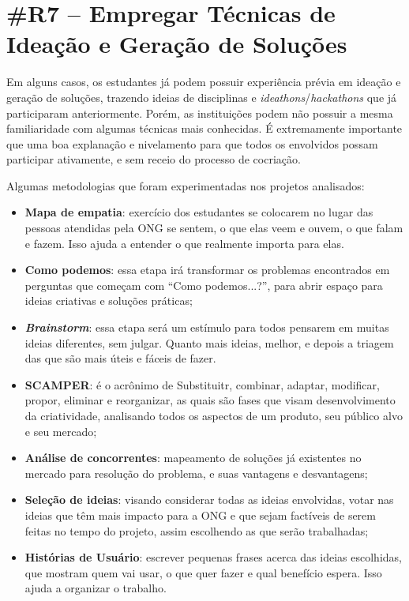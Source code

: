 \section*{\#R7 – Empregar Técnicas de Ideação e Geração de Soluções}

Em alguns casos, os estudantes já podem possuir experiência prévia em ideação e geração de soluções, trazendo ideias de disciplinas e \textit{ideathons}/\textit{hackathons} que já participaram anteriormente. Porém, as instituições podem não possuir a mesma familiaridade com algumas técnicas mais conhecidas. É extremamente importante que uma boa explanação e nivelamento para que todos os envolvidos possam participar ativamente, e sem receio do processo de cocriação.

Algumas metodologias que foram experimentadas nos projetos analisados:
\begin{itemize}
    \item \textbf{Mapa de empatia}: exercício dos estudantes se colocarem no lugar das pessoas atendidas pela ONG se sentem, o que elas veem e ouvem, o que falam e fazem. Isso ajuda a entender o que realmente importa para elas.
    \item \textbf{Como podemos}: essa etapa irá transformar os problemas encontrados em perguntas que começam com “Como podemos...?”, para abrir espaço para ideias criativas e soluções práticas;
    \item \textbf{\textit{Brainstorm}}: essa etapa será um estímulo para todos pensarem em muitas ideias diferentes, sem julgar. Quanto mais ideias, melhor, e depois a triagem das que são mais úteis e fáceis de fazer.
    \item \textbf{SCAMPER}: é o acrônimo de Substituitr, combinar, adaptar, modificar, propor, eliminar e reorganizar, as quais são fases que visam desenvolvimento da criatividade, analisando todos os aspectos de um produto, seu público alvo e seu mercado;
    \item \textbf{Análise de concorrentes}: mapeamento de soluções já existentes no mercado para resolução do problema, e suas vantagens e desvantagens;
    \item \textbf{Seleção de ideias}: visando considerar todas as ideias envolvidas,  votar nas ideias que têm mais impacto para a ONG e que sejam factíveis de serem feitas no tempo do projeto, assim escolhendo as que serão trabalhadas;
    \item \textbf{Histórias de Usuário}: escrever pequenas frases acerca das ideias escolhidas, que mostram quem vai usar, o que quer fazer e qual benefício espera. Isso ajuda a organizar o trabalho.
\end{itemize}

